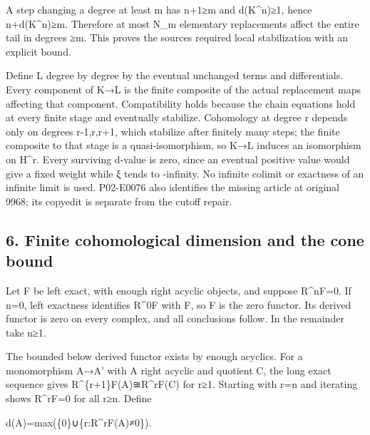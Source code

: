 A step changing a degree at least m has n\allowbreak{}+1≥m and d(K\textasciicircum{}n)\allowbreak{}≥1,\allowbreak{} hence n\allowbreak{}+d(K\textasciicircum{}n)\allowbreak{}≥m. Therefore at most N\_\allowbreak{}m elementary replacements affect the entire tail in degrees ≥m. This proves the source\textquotesingle s required local stabilization with an explicit bound.

Define L degree by degree by the eventual unchanged terms and differentials. Every component of K\allowbreak{}→L is the finite composite of the actual replacement maps affecting that component. Compatibility holds because the chain equations hold at every finite stage and eventually stabilize. Cohomology at degree r depends only on degrees r-1,\allowbreak{}r,\allowbreak{}r\allowbreak{}+1,\allowbreak{} which stabilize after finitely many steps; the finite composite to that stage is a quasi-isomorphism,\allowbreak{} so K\allowbreak{}→L induces an isomorphism on H\^{}r. Every surviving d-value is zero,\allowbreak{} since an eventual positive value would give a fixed weight while ξ tends to -infinity. No infinite colimit or exactness of an infinite limit is used. P02-E0076 also identifies the missing article at original 9968; its copyedit is separate from the cutoff repair.

\subsection{6. Finite cohomological dimension and the cone bound}\label{proofs-9746-10132-finite-cohomological-dimension-and-the-cone-bound}

Let F be left exact,\allowbreak{} with enough right acyclic objects,\allowbreak{} and suppose R\textasciicircum{}nF\allowbreak{}=0. If n\allowbreak{}=0,\allowbreak{} left exactness identifies R\^{}0F with F,\allowbreak{} so F is the zero functor. Its derived functor is zero on every complex,\allowbreak{} and all conclusions follow. In the remainder take n≥1.

The bounded below derived functor exists by enough acyclics. For a monomorphism A\allowbreak{}→A' with A\textquotesingle{} right acyclic and quotient C,\allowbreak{} the long exact sequence gives R\textasciicircum{}\{r\allowbreak{}+1\}F(A)\allowbreak{}≅R\textasciicircum{}rF(C)\allowbreak{} for r≥1. Starting with r\allowbreak{}=n and iterating shows R\textasciicircum{}rF\allowbreak{}=0 for all r≥n. Define

d(A)\allowbreak{}\allowbreak{}=max(\{0\}∪\{r:\allowbreak{}R\textasciicircum{}rF(A)\allowbreak{}≠0\})\allowbreak{}.

